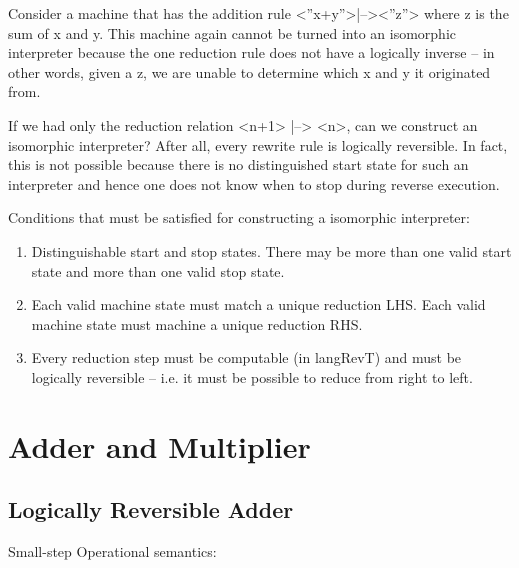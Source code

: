 \documentclass{llncs}
\begin{document}
Consider a machine that has the addition rule {{<''x+y''>|--><''z''>}}
where {{z}} is the sum of {{x}} and {{y}}. This machine again cannot
be turned into an isomorphic interpreter because the one reduction
rule does not have a logically inverse -- in other words, given a
{{z}}, we are unable to determine which {{x}} and {{y}} it originated
from.

If we had only the reduction relation {{<n+1> |--> <n>}}, can we
construct an isomorphic interpreter? After all, every rewrite rule is
logically reversible. In fact, this is not possible because there is
no distinguished start state for such an interpreter and hence one
does not know when to stop during reverse execution.

\noindent
Conditions that must be satisfied for constructing a isomorphic
interpreter:

\begin{enumerate}

\item Distinguishable start and stop states. There may be more than one
  valid start state and more than one valid stop state.

\item Each valid machine state must match a unique reduction LHS. Each
  valid machine state must machine a unique reduction RHS.

\item Every reduction step must be computable (in {{langRevT}}) and
  must be logically reversible -- i.e. it must be possible to reduce
  from right to left.

\end{enumerate}


\section{Adder and Multiplier}

\subsection{Logically Reversible Adder}

%

Small-step Operational semantics:

\end{document}
